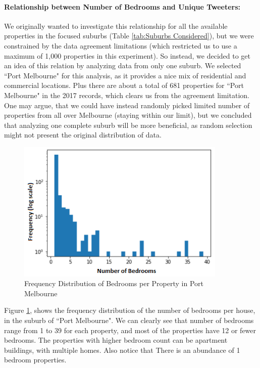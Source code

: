 \documentclass[12pt]{report}
\theoremstyle{named}
\begin{document}
\paragraph{Relationship between Number of Bedrooms and Unique Tweeters:\\}
We originally wanted to investigate this relationship for all the available properties in the focused suburbs (Table \ref{tab:Suburbs Considered}), but we were constrained by the data agreement limitations (which restricted us to use a maximum of 1,000 properties in this experiment). So instead, we decided to get an idea of this relation by analyzing data from only one suburb. We selected ``Port Melbourne"  for this analysis, as it provides a nice mix of residential and commercial locations. Plus there are about a total of 681 properties for ``Port Melbourne" in the 2017 records, which clears us from the agreement limitation. 
One may argue, that we could have instead randomly picked limited number of properties from all over Melbourne (staying within our limit), but we concluded that analyzing one complete suburb will be more beneficial, as random selection might not present the original distribution of data.

\begin{figure}[ht]
\centering
        \includegraphics[width=100mm,scale=1]{Images/bedRoomFrequencyDistribuion.PNG}
    \caption{Frequency Distribution of Bedrooms per Property in Port Melbourne}
    \label{fig:BedRoomDistribution}
\end{figure}

Figure \ref{fig:BedRoomDistribution}, shows the frequency distribution of the number of bedrooms per house, in the suburb of ``Port Melbourne". We can clearly see that number of bedrooms range from 1 to 39 for each property, and most of the properties have 12 or fewer bedrooms. The properties with higher bedroom count can be apartment buildings, with multiple homes. Also notice that There is an abundance of 1 bedroom properties.
\end{document}
